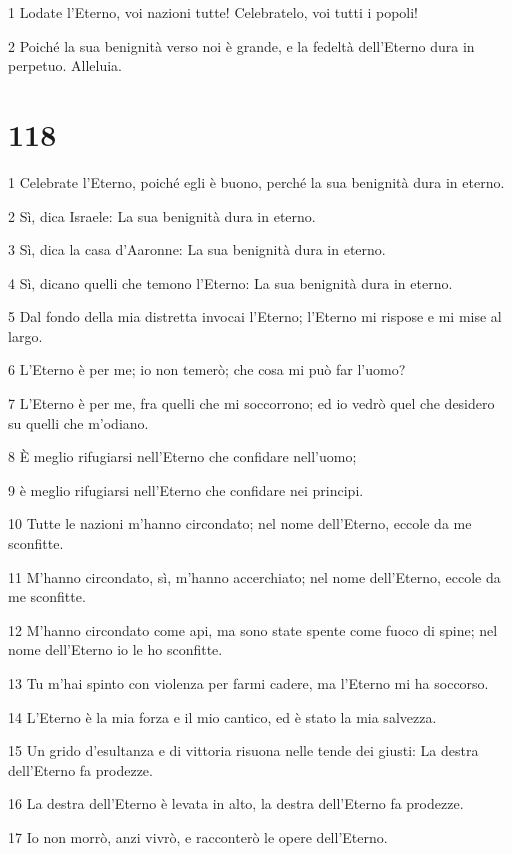 \par 1 Lodate l'Eterno, voi nazioni tutte! Celebratelo, voi tutti i popoli!
\par 2 Poiché la sua benignità verso noi è grande, e la fedeltà dell'Eterno dura in perpetuo. Alleluia.

\chapter{118}

\par 1 Celebrate l'Eterno, poiché egli è buono, perché la sua benignità dura in eterno.
\par 2 Sì, dica Israele: La sua benignità dura in eterno.
\par 3 Sì, dica la casa d'Aaronne: La sua benignità dura in eterno.
\par 4 Sì, dicano quelli che temono l'Eterno: La sua benignità dura in eterno.
\par 5 Dal fondo della mia distretta invocai l'Eterno; l'Eterno mi rispose e mi mise al largo.
\par 6 L'Eterno è per me; io non temerò; che cosa mi può far l'uomo?
\par 7 L'Eterno è per me, fra quelli che mi soccorrono; ed io vedrò quel che desidero su quelli che m'odiano.
\par 8 È meglio rifugiarsi nell'Eterno che confidare nell'uomo;
\par 9 è meglio rifugiarsi nell'Eterno che confidare nei principi.
\par 10 Tutte le nazioni m'hanno circondato; nel nome dell'Eterno, eccole da me sconfitte.
\par 11 M'hanno circondato, sì, m'hanno accerchiato; nel nome dell'Eterno, eccole da me sconfitte.
\par 12 M'hanno circondato come api, ma sono state spente come fuoco di spine; nel nome dell'Eterno io le ho sconfitte.
\par 13 Tu m'hai spinto con violenza per farmi cadere, ma l'Eterno mi ha soccorso.
\par 14 L'Eterno è la mia forza e il mio cantico, ed è stato la mia salvezza.
\par 15 Un grido d'esultanza e di vittoria risuona nelle tende dei giusti: La destra dell'Eterno fa prodezze.
\par 16 La destra dell'Eterno è levata in alto, la destra dell'Eterno fa prodezze.
\par 17 Io non morrò, anzi vivrò, e racconterò le opere dell'Eterno.
